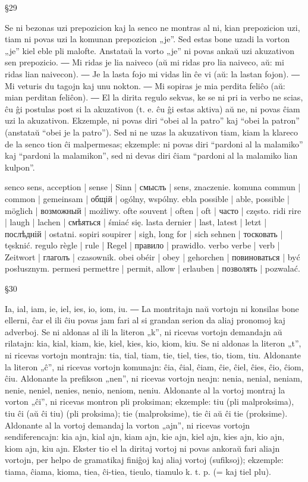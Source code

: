 §29

Se ni bezonas uzi prepozicion kaj la senco ne montras al ni, kian prepozicion uzi, tiam ni povas uzi la komunan prepozicion „je”. Sed estas bone uzadi la vorton „je” kiel eble pli malofte. Anstataŭ la vorto „je” ni povas ankaŭ uzi akuzativon sen prepozicio. ― Mi ridas je lia naiveco (aŭ mi ridas pro lia naiveco, aŭ: mi ridas lian naivecon). ― Je la lasta fojo mi vidas lin ĉe vi (aŭ: la lastan fojon). ― Mi veturis du tagojn kaj unu nokton. ― Mi sopiras je mia perdita feliĉo (aŭ: mian perditan feliĉon). ― El la dirita regulo sekvas, ke se ni pri ia verbo ne scias, ĉu ĝi postulas post si la akuzativon (t. e. ĉu ĝi estas aktiva) aŭ ne, ni povas ĉiam uzi la akuzativon. Ekzemple, ni povas diri “obei al la patro” kaj “obei la patron” (anstataŭ “obei je la patro”). Sed ni ne uzas la akuzativon tiam, kiam la klareco de la senco tion ĉi malpermesas; ekzemple: ni povas diri “pardoni al la malamiko” kaj “pardoni la malamikon”, sed ni devas diri ĉiam “pardoni al la malamiko lian kulpon”.

senco sens, acception | sense | Sinn | смыслъ | sens, znaczenie.
komuna commun | common | gemeinsam | общій | ogólny, wspólny.
ebla possible | able, possible | möglich | возможный | możliwy.
ofte souvent | often | oft | часто | często.
ridi rire | laugh | lachen | смѣяться | śmiać się.
lasta dernier | last, latest | letzt | послѣдній | ostatni.
sopiri soupirer | sigh, long for | sich sehnen | тосковать | tęsknić.
regulo règle | rule | Regel | правило | prawidło.
verbo verbe | verb | Zeitwort | глаголъ | czasownik.
obei obéir | obey | gehorchen | повиноваться | być posłusznym.
permesi permettre | permit, allow | erlauben | позволять | pozwalać.

§30

Ia, ial, iam, ie, iel, ies, io, iom, iu. ― La montritajn naŭ vortojn ni konsilas bone ellerni, ĉar el ili ĉiu povas jam fari al si grandan serion da aliaj pronomoj kaj adverboj. Se ni aldonas al ili la literon „k”, ni ricevas vortojn demandajn aŭ rilatajn: kia, kial, kiam, kie, kiel, kies, kio, kiom, kiu. Se ni aldonas la literon „t”, ni ricevas vortojn montrajn: tia, tial, tiam, tie, tiel, ties, tio, tiom, tiu. Aldonante la literon „ĉ”, ni ricevas vortojn komunajn: ĉia, ĉial, ĉiam, ĉie, ĉiel, ĉies, ĉio, ĉiom, ĉiu. Aldonante la prefikson „nen”, ni ricevas vortojn neajn: nenia, nenial, neniam, nenie, neniel, nenies, nenio, neniom, neniu. Aldonante al la vortoj montraj la vorton „ĉi”, ni ricevas montron pli proksiman; ekzemple: tiu (pli malproksima), tiu ĉi (aŭ ĉi tiu) (pli proksima); tie (malproksime), tie ĉi aŭ ĉi tie (proksime). Aldonante al la vortoj demandaj la vorton „ajn”, ni ricevas vortojn sendiferencajn: kia ajn, kial ajn, kiam ajn, kie ajn, kiel ajn, kies ajn, kio ajn, kiom ajn, kiu ajn. Ekster tio el la diritaj vortoj ni povas ankoraŭ fari aliajn vortojn, per helpo de gramatikaj finiĝoj kaj aliaj vortoj (sufiksoj); ekzemple: tiama, ĉiama, kioma, tiea, ĉi-tiea, tieulo, tiamulo k. t. p. (= kaj tiel plu).

